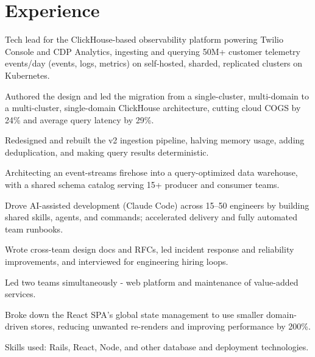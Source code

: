 \section{Experience}

    \begin{tightemize}
      \item Tech lead for the ClickHouse-based observability platform powering Twilio Console and CDP Analytics, ingesting and querying 50M+ customer telemetry events/day (events, logs, metrics) on self-hosted, sharded, replicated clusters on Kubernetes.
      \item Authored the design and led the migration from a single-cluster, multi-domain to a multi-cluster, single-domain ClickHouse architecture, cutting cloud COGS by 24\% and average query latency by 29\%.
      \item Redesigned and rebuilt the v2 ingestion pipeline, halving memory usage, adding deduplication, and making query results deterministic.
      \item Architecting an event-streams firehose into a query-optimized data warehouse, with a shared schema catalog serving 15+ producer and consumer teams.
      \item Drove AI-assisted development (Claude Code) across 15--50 engineers by building shared skills, agents, and commands; accelerated delivery and fully automated team runbooks.
      \item Wrote cross-team design docs and RFCs, led incident response and reliability improvements, and interviewed for engineering hiring loops.
    \end{tightemize}
    \sectionsep

    \begin{tightemize}
      \item Led two teams simultaneously - web platform and maintenance of value-added services.
      \item Broke down the React SPA's global state management to use smaller domain-driven stores, reducing unwanted re-renders and improving performance by 200\%.
      \item Skills used: Rails, React, Node, and other database and deployment technologies.
    \end{tightemize} 
    \sectionsep

